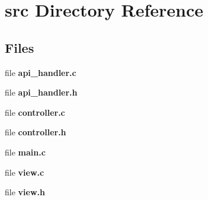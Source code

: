 \section{src Directory Reference}
\label{dir_68267d1309a1af8e8297ef4c3efbcdba}
\subsection*{Files}
\begin{DoxyCompactItemize}
\item 
file \textbf{ api\+\_\+handler.\+c}
\item 
file \textbf{ api\+\_\+handler.\+h}
\item 
file \textbf{ controller.\+c}
\item 
file \textbf{ controller.\+h}
\item 
file \textbf{ main.\+c}
\item 
file \textbf{ view.\+c}
\item 
file \textbf{ view.\+h}
\end{DoxyCompactItemize}
